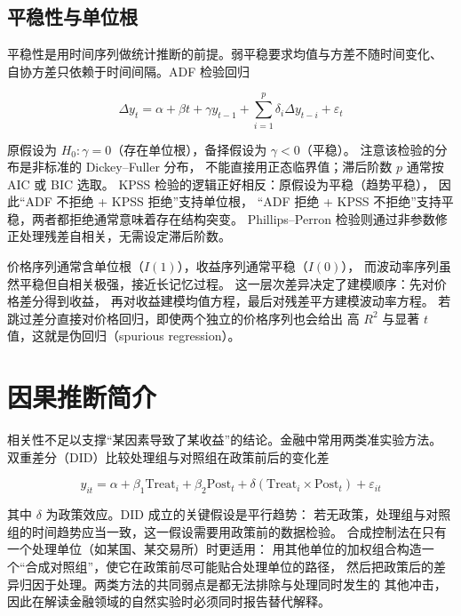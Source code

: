 \subsection{平稳性与单位根}

平稳性是用时间序列做统计推断的前提。弱平稳要求均值与方差不随时间变化、
自协方差只依赖于时间间隔。ADF 检验回归

\begin{equation}
  \Delta y_t = \alpha + \beta t + \gamma y_{t-1} + \sum_{i=1}^{p}\delta_i \Delta y_{t-i} + \varepsilon_t
  \label{eq:08-adf}
\end{equation}

原假设为 $H_0: \gamma = 0$（存在单位根），备择假设为 $\gamma < 0$（平稳）。
注意该检验的分布是非标准的 Dickey--Fuller 分布，
不能直接用正态临界值；滞后阶数 $p$ 通常按 AIC 或 BIC 选取。
KPSS 检验的逻辑正好相反：原假设为平稳（趋势平稳），
因此“ADF 不拒绝 + KPSS 拒绝”支持单位根，
“ADF 拒绝 + KPSS 不拒绝”支持平稳，两者都拒绝通常意味着存在结构突变。
Phillips--Perron 检验则通过非参数修正处理残差自相关，无需设定滞后阶数。

\begin{notebox}[价格、收益与波动率序列的平稳性差异]
价格序列通常含单位根（$I(1)$），收益序列通常平稳（$I(0)$），
而波动率序列虽然平稳但自相关极强，接近长记忆过程。
这一层次差异决定了建模顺序：先对价格差分得到收益，
再对收益建模均值方程，最后对残差平方建模波动率方程。
若跳过差分直接对价格回归，即使两个独立的价格序列也会给出
高 $R^{2}$ 与显著 $t$ 值，这就是伪回归（spurious regression）。
\end{notebox}

\section{因果推断简介}

相关性不足以支撑“某因素导致了某收益”的结论。金融中常用两类准实验方法。
双重差分（DID）比较处理组与对照组在政策前后的变化差

\begin{equation}
  y_{it} = \alpha + \beta_1 \text{Treat}_i + \beta_2 \text{Post}_t
  + \delta\left(\text{Treat}_i \times \text{Post}_t\right) + \varepsilon_{it}
  \label{eq:08-did}
\end{equation}

其中 $\delta$ 为政策效应。DID 成立的关键假设是平行趋势：
若无政策，处理组与对照组的时间趋势应当一致，这一假设需要用政策前的数据检验。
合成控制法在只有一个处理单位（如某国、某交易所）时更适用：
用其他单位的加权组合构造一个“合成对照组”，使它在政策前尽可能贴合处理单位的路径，
然后把政策后的差异归因于处理。两类方法的共同弱点是都无法排除与处理同时发生的
其他冲击，因此在解读金融领域的自然实验时必须同时报告替代解释。

